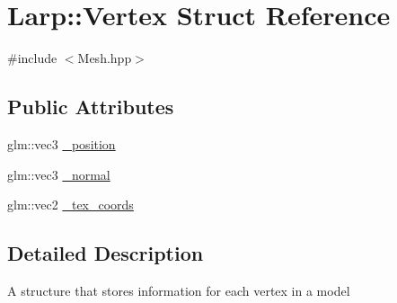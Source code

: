 \hypertarget{structLarp_1_1Vertex}{\section{Larp\-:\-:Vertex Struct Reference}
\label{structLarp_1_1Vertex}
}


{\ttfamily \#include $<$Mesh.\-hpp$>$}

\subsection*{Public Attributes}
\begin{DoxyCompactItemize}
\item 
glm\-::vec3 \hyperlink{structLarp_1_1Vertex_a271f825c3a02f11e49a16f2432f62765}{\-\_\-position}
\item 
glm\-::vec3 \hyperlink{structLarp_1_1Vertex_aefb3ec6fe143142c52dd48353c391b27}{\-\_\-normal}
\item 
glm\-::vec2 \hyperlink{structLarp_1_1Vertex_aa3c59b04ad38f2861683c2784bc137fd}{\-\_\-tex\-\_\-coords}
\end{DoxyCompactItemize}


\subsection{Detailed Description}
A structure that stores information for each vertex in a model 

